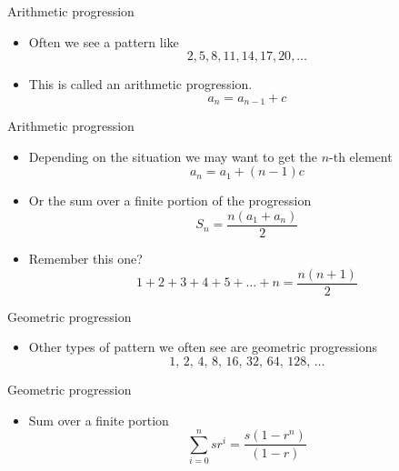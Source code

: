 \documentclass{beamer}
\begin{document}
\begin{frame}[plain]{Arithmetic progression}
  \vspace{30pt}
  \begin{itemize}
    \item Often we see a pattern like
      \[
        2 , 5 , 8 , 11 , 14, 17, 20, \ldots
      \]
    \item This is called an arithmetic progression.
      \[
        a_n = a_{n-1} + c
      \]
  \end{itemize}
\end{frame}

\begin{frame}[plain]{Arithmetic progression}
  \vspace{30pt}
  \begin{itemize}
    \item Depending on the situation we may want to get the $n$-th element
      \[
        a_n = a_1 + (n-1) c
      \]
    \item Or the sum over a finite portion of the progression
      \[
        S_n = \frac{n(a_1 + a_n)}{2}
      \]
    \item Remember this one?
      \[
        1 + 2 + 3 + 4 + 5 + \ldots + n = \frac{n(n+1)}{2}
      \]
  \end{itemize}
\end{frame}

\begin{frame}[plain]{Geometric progression}
  \vspace{30pt}
  \begin{itemize}
    \item Other types of pattern we often see are geometric progressions
      \[
        1,\, 2,\, 4,\, 8,\, 16,\, 32,\, 64,\, 128,\, \ldots
      \]
  \end{itemize}
\end{frame}

\begin{frame}[plain]{Geometric progression}
  \vspace{30pt}
  \begin{itemize}
    \item Sum over a finite portion
      \[
        \sum_{i = 0}^n sr^i =  \frac{s(1-r^n)}{(1-r)}
      \]
  \end{itemize}
\end{frame}
\end{document}
